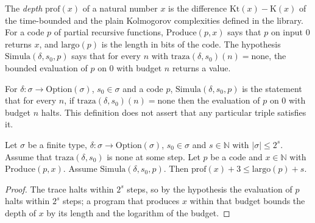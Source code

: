 The \emph{depth} $\mathrm{prof}(x)$ of a natural number $x$ is the difference $\mathrm{Kt}(x) -
\mathrm{K}(x)$ of the time-bounded and the plain Kolmogorov complexities defined in the library.
For a code $p$ of partial recursive functions, $\mathrm{Produce}(p, x)$ says that $p$ on input $0$
returns $x$, and $\mathrm{largo}(p)$ is the length in bits of the code. The hypothesis
$\mathrm{Simula}(\delta, s_0, p)$ says that for every $n$ with $\mathrm{traza}(\delta, s_0)(n) =
\mathrm{none}$, the bounded evaluation of $p$ on $0$ with budget $n$ returns a value.

\begin{definition}
  \label{def:dynamics-simula}
  \leanok
  For $\delta : \sigma \to \mathrm{Option}(\sigma)$, $s_0 \in \sigma$ and a code $p$,
  $\mathrm{Simula}(\delta, s_0, p)$ is the statement that for every $n$, if
  $\mathrm{traza}(\delta, s_0)(n) = \mathrm{none}$ then the evaluation of $p$ on $0$ with budget $n$
  halts. This definition does not assert that any particular triple satisfies it.
  \own{}
\end{definition}

\begin{theorem}
  \label{thm:dynamics-memory-depth}
  \leanok
  Let $\sigma$ be a finite type, $\delta : \sigma \to \mathrm{Option}(\sigma)$, $s_0 \in \sigma$ and
  $s \in \mathbb{N}$ with $|\sigma| \le 2^s$. Assume that $\mathrm{traza}(\delta, s_0)$ is
  $\mathrm{none}$ at some step. Let $p$ be a code and $x \in \mathbb{N}$ with
  $\mathrm{Produce}(p, x)$. Assume $\mathrm{Simula}(\delta, s_0, p)$. Then
  $\mathrm{prof}(x) + 3 \le \mathrm{largo}(p) + s$.
  \own{}
\end{theorem}

\begin{proof}
  \leanok
  The trace halts within $2^s$ steps, so by the hypothesis the evaluation of $p$ halts within $2^s$
  steps; a program that produces $x$ within that budget bounds the depth of $x$ by its length and
  the logarithm of the budget.
\end{proof}

